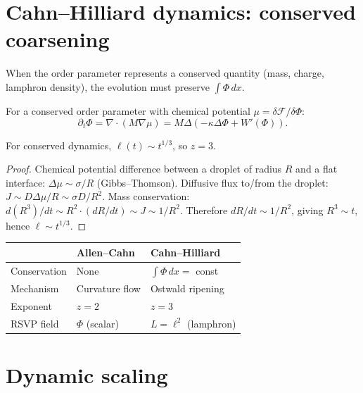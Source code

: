 \section{Cahn--Hilliard dynamics: conserved coarsening}

When the order parameter represents a conserved quantity
(mass, charge, lamphron density), the evolution must preserve
$\int\Phi\,dx$.

\begin{definition}
  For a conserved order parameter with chemical potential
  $\mu = \delta\mathcal{F}/\delta\Phi$:
  \[
    \partial_t\Phi = \nabla\cdot(M\nabla\mu)
    = M\Delta(-\kappa\Delta\Phi + W'(\Phi)).
  \]
\end{definition}

\begin{theorem}
  \label{thm:ls-exponent}
  \statusproven{}
  For conserved dynamics, $\ell(t) \sim t^{1/3}$, so $z = 3$.
\end{theorem}

\begin{proof}
  Chemical potential difference between a droplet of radius $R$
  and a flat interface: $\Delta\mu \sim \sigma/R$ (Gibbs--Thomson).
  Diffusive flux to/from the droplet: $J \sim D\Delta\mu/R \sim \sigma D/R^2$.
  Mass conservation: $d(R^3)/dt \sim R^2 \cdot (dR/dt) \sim J \sim 1/R^2$.
  Therefore $dR/dt \sim 1/R^2$, giving $R^3 \sim t$, hence $\ell \sim t^{1/3}$.
\end{proof}

\begin{CrossDomain}
  \begin{center}
  \begin{tabular}{@{}lll@{}}
    \toprule
    & \textbf{Allen--Cahn} & \textbf{Cahn--Hilliard} \\
    \midrule
    Conservation & None & $\int\Phi\,dx = $ const \\
    Mechanism & Curvature flow & Ostwald ripening \\
    Exponent & $z = 2$ & $z = 3$ \\
    RSVP field & $\Phi$ (scalar) & $L = \ell^2$ (lamphron) \\
    \bottomrule
  \end{tabular}
  \end{center}
\end{CrossDomain}

\section{Dynamic scaling}


